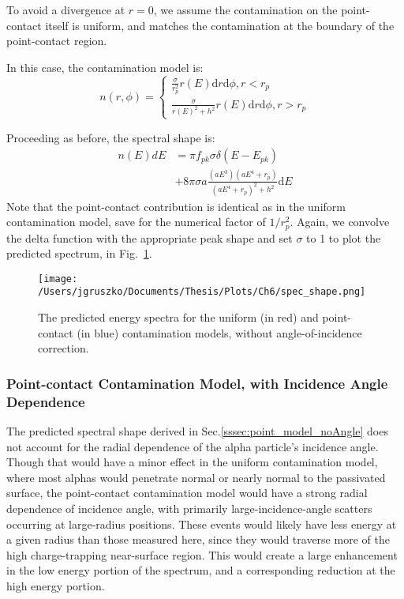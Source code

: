 To avoid a divergence at $r=0$, we assume the contamination on the point-contact itself is uniform, and matches the contamination at the boundary of the point-contact region. 

In this case, the contamination model is:
$$n(r, \phi)=
\begin{cases}
\frac{\sigma}{r_p^2} r(E) \mathrm{d}r \mathrm{d}\phi, r<r_p \\
\frac{\sigma}{r(E)^2+h^2} r(E) \mathrm{d}r \mathrm{d}\phi, r>r_p
\end{cases}
$$

Proceeding as before, the spectral shape is:
\begin{equation}
\begin{split}
n(E)dE &= \pi f_{pk}\sigma\delta(E-E_{pk}) \\
&+ 8\pi \sigma a \frac{(aE^3)(aE^4+r_p)}{(aE^4+r_p)^2+h^2} \mathrm{d}E
\end{split}
\end{equation}
Note that the point-contact contribution is identical as in the uniform contamination model, save for the numerical factor of $1/r_p^2$. Again, we convolve the delta function with the appropriate peak shape and set $\sigma$ to 1 to plot the predicted spectrum, in Fig.~\ref{fig:spec_shape}. 

\begin{figure}[]
 \centering
 \texttt{[image: /Users/jgruszko/Documents/Thesis/Plots/Ch6/spec\_shape.png]}
 \caption[The predicted energy spectra for the uniform and point-contact contamination models]{The predicted energy spectra for the uniform (in red) and point-contact (in blue) contamination models, without angle-of-incidence correction.} 
 \label{fig:spec_shape}
\end{figure}


\subsubsection{Point-contact Contamination Model, with Incidence Angle Dependence}
The predicted spectral shape derived in Sec.\ref{sssec:point_model_noAngle} does not account for the radial dependence of the alpha particle's incidence angle. Though that would have a minor effect in the uniform contamination model, where most alphas would penetrate normal or nearly normal to the passivated surface, the point-contact contamination model would have a strong radial dependence of incidence angle, with primarily large-incidence-angle scatters occurring at large-radius positions. These events would likely have less energy at a given radius than those measured here, since they would traverse more of the high charge-trapping near-surface region. This would create a large enhancement in the low energy portion of the spectrum, and a corresponding reduction at the high energy portion.

